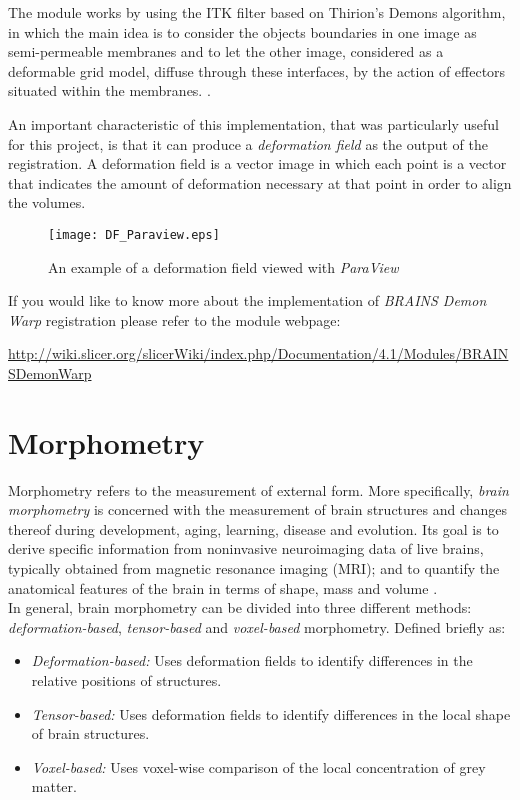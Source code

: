The module works by using the ITK filter based on Thirion's Demons
algorithm, in which the main idea is to consider the objects
boundaries in one image as semi-permeable membranes and to let the
other image, considered as a deformable grid model, diffuse through
these interfaces, by the action of effectors situated within the
membranes. \cite{thirion}.

An important characteristic of this implementation, that was
particularly useful for this project, is that it can produce a
\textit{deformation field} as the output of the registration. A
deformation field is a vector image in which each point is a vector
that indicates the amount of deformation necessary
at that point in order to align the volumes.\\

\begin{figure}[H]
  \centering
  \texttt{[image: DF\_Paraview.eps]}
  \caption{An example of a deformation field viewed with \textit{ParaView}}
  \label{voxel_ex_5}
\end{figure}


If you would like to know more about the implementation of
\textit{BRAINS Demon Warp} registration please refer to the module
webpage:

\url{http://wiki.slicer.org/slicerWiki/index.php/Documentation/4.1/Modules/BRAINSDemonWarp}


\section{Morphometry}
Morphometry refers to the measurement of external form. More
specifically, \textit{brain morphometry} is concerned with the
measurement of brain structures and changes thereof during
development, aging, learning, disease and evolution. Its goal is to
derive specific information from noninvasive neuroimaging data of live
brains, typically obtained from magnetic resonance imaging (MRI); and
to quantify the anatomical features of the brain in terms of shape,
mass and volume \cite{brmorph}.\\

In general, brain morphometry can be divided into three different methods: \textit{deformation-based}, \textit{tensor-based} and \textit{voxel-based} morphometry. Defined briefly as:
\begin{itemize}
\item \textit{Deformation-based:} Uses deformation fields to identify differences in the relative positions of structures.
\item \textit{Tensor-based:} Uses deformation fields to identify differences in the local shape of brain structures.
\item \textit{Voxel-based:} Uses voxel-wise comparison of the local concentration of grey matter.
\end{itemize}


